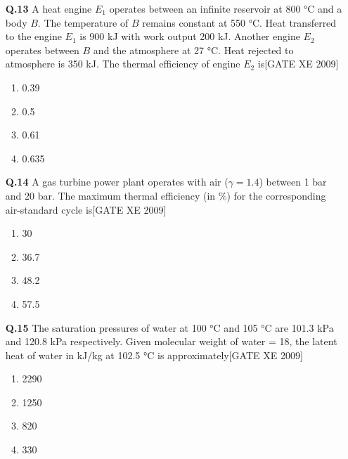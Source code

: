 \documentclass[journal,12pt,onecolumn]{IEEEtran}
\theoremstyle{remark}
\begin{document}
\begin{enumerate}
\begin{enumerate}
\begin{enumerate}
\vspace{0.3cm}

\item[\textbf{Q.13}]A heat engine $E_1$ operates between an infinite reservoir at 800 °C and a body $B$. The temperature of $B$ remains constant at 550 °C. Heat transferred to the engine $E_1$ is 900 kJ with work output 200 kJ. Another engine $E_2$ operates between $B$ and the atmosphere at 27 °C. Heat rejected to atmosphere is 350 kJ. The thermal efficiency of engine $E_2$ is\hfill[GATE XE 2009]
\begin{multicols}{2}
\begin{enumerate}
    \item 0.39
    \item 0.5
    \item 0.61
    \item 0.635
\end{enumerate}
\end{multicols}

\vspace{0.3cm}

\item[\textbf{Q.14}] A gas turbine power plant operates with air ($\gamma=1.4$) between 1 bar and 20 bar. The maximum thermal efficiency (in \%) for the corresponding air-standard cycle is\hfill[GATE XE 2009]
\begin{multicols}{2}
\begin{enumerate}
    \item 30
    \item 36.7
    \item 48.2
    \item 57.5
\end{enumerate}
\end{multicols}

\vspace{0.3cm}

\item[\textbf{Q.15}] The saturation pressures of water at 100 °C and 105 °C are 101.3 kPa and 120.8 kPa respectively. Given molecular weight of water = 18, the latent heat of water in kJ/kg at 102.5 °C is approximately\hfill[GATE XE 2009]
\begin{multicols}{2}
\begin{enumerate}
    \item 2290
    \item 1250
    \item 820
    \item 330
\end{enumerate}
\end{multicols}


\end{enumerate}
\end{enumerate}
\end{enumerate}
\end{document}
